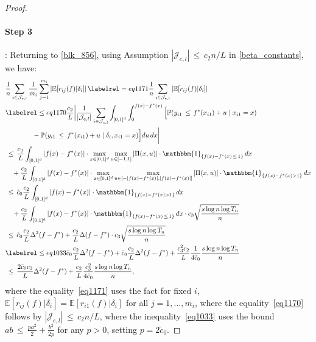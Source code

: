 \documentclass[twoside,11pt]{article}
\begin{document}
\begin{proof}
\paragraph{Step 3}:
Returning to \eqref{blk_856}, using Assumption $|\mathcal{J}_{e,l}| \,\leq\, c_2 n/L$ in \eqref{beta_constants}, we have:
\begin{align*}
    &\frac{1}{n}\sum_{i \in \mathcal{J}_{e,l}} \frac{1}{m_i}\sum_{j=1}^{m_{i}}\left|\mathbb{E}[r_{ij}(f)|\delta_i]\right| \labelrel={eq1171} \frac{1}{n}\sum_{i \in \mathcal{J}_{e,l}} \left|\mathbb{E}[r_{ij}(f)|\delta_i]\right|  \\
    & \labelrel\leq{eq1170} \frac{c_2}{L}\bigg| \frac{1}{|\mathcal{J}_{e,l}|} \sum_{i\in \mathcal{J}_{e,l}} \int_{[0,1]^d}\int_0^{f(x) - f^*(x)} \Big[ \mathbb{P}(y_{i1} \,\leq\, f^*(x_{i1}) + u \mid x_{i1}=x) \\
    &\qquad\qquad - \mathbb{P}(y_{i1} \,\leq\, f^*(x_{i1}) + u \mid \delta_i, x_{i1} = x) \Big] du \, dx \bigg| \\
    &\,\leq\, \frac{c_2}{L}\int_{[0,1]^d} \left| f(x) - f^*(x) \right| \cdot \max_{x\in[0,1]^d}\max_{u \in [-1,1]} |\Pi(x,u)| \cdot \mathbbm{1}_{\{f(x) - f^*(x) \,\leq\, 1\}} \, dx \\
    &\quad + \frac{c_2}{L}\int_{[0,1]^d} \left| f(x) - f^*(x) \right| \cdot \max_{x\in[0,1]^d}\max_{u \in [-|f(x) - f^*(x)|, |f(x) - f^*(x)|]}|\Pi(x,u)| \cdot \mathbbm{1}_{\{f(x) - f^*(x) > 1\}} \, dx \\
    &\,\leq\, \tilde c_0 \frac{c_2}{L}\int_{[0,1]^d} \left| f(x) - f^*(x) \right| \cdot \mathbbm{1}_{\{f(x) - f^*(x) > 1\}} \, dx \\
    &\quad + \frac{c_2}{L}\int_{[0,1]^d} \left| f(x) - f^*(x) \right| \cdot \mathbbm{1}_{\{f(x) - f^*(x) \,\leq\, 1\}} \, dx \cdot c_3\sqrt{\frac{s\log n \log T_n}{n}} \\
    &\,\leq\, \tilde c_0 \frac{c_2}{L} \Delta^2(f-f^*) + \frac{c_2}{L}\Delta(f-f^*)\cdot c_3\sqrt{\frac{s\log n \log T_n}{n}} \\
    & \labelrel\leq{eq1033}  \tilde c_0\frac{c_2}{L}  \Delta^2(f-f^*) + \tilde c_0 \frac{c_2}{L}\Delta^2(f-f^*)+ \frac{c_3^2c_2}{L}\frac{1}{4\tilde c_0}\frac{s\log n\log T_n}{n}  \\
&\,\leq\, \frac{2\tilde c_0c_2}{L}  \Delta^2(f-f^*)+ \frac{c_2}{L}\frac{c_3^2}{4\tilde c_0}\frac{s\log n\log T_n}{n},
\end{align*}
where the equality~\eqref{eq1171} uses the fact for fixed $i$, $\mathbb{E}[r_{ij}(f)|\delta_i] = \mathbb{E}[r_{i1}(f)|\delta_i]$ for all $j=1, \dots, m_i$, where the equality~\eqref{eq1170} follows by $|\mathcal{J}_{e,l}| \,\leq\, c_2 n/L$, 
where the inequality~\eqref{eq1033} uses the bound $ab \,\leq\,  \frac{pa^2}{2} + \frac{b^2}{2p}$ for any $p > 0$, setting $p = 2\tilde c_0$.


\end{proof}
\end{document}
